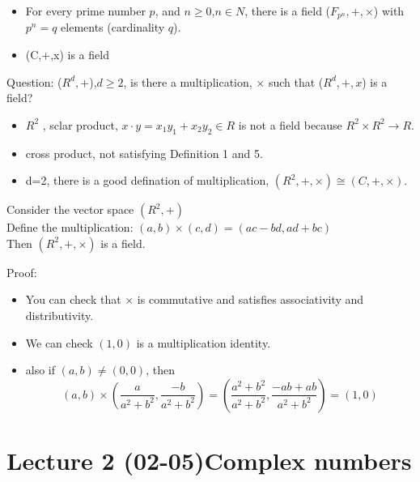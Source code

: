 \begin{example}[Fields]{}
    \begin{itemize}
        \item For every prime number $p$, and $n \geq 0$,$n \in N$, there is a field ($F_{p^n},+,\times$) with $p^n=q$ elements (cardinality $q$).
        \item (C,+,x) is a field
    \end{itemize}
    \end{example}
Question: ($R^d,+$),$d\geq 2$, is there a multiplication, $\times$ such that ($R^d,+,x$) is a field?
\begin{itemize}
    \item $R^2$ , sclar product, $x \cdot y=x_1y_1+x_2y_2 \in R$ is not a field because $R^2 \times R^2 \rightarrow R$.
    \item cross product, not satisfying Definition 1 and 5.
    \item d=2, there is a good defination of multiplication, $(R^2,+,\times)\cong (C,+,\times)$.
\end{itemize}
\begin{lemma}{1}{}
    Consider the vector space $(R^2,+)$
    \\Define the multiplication:
    $(a,b) \times (c,d) = (ac-bd,ad+bc)$
    \\Then $(R^2,+,\times)$ is a field.
    \end{lemma}
Proof: 
\begin{itemize}
    \item You can check that $\times$ is commutative and satisfies associativity and distributivity.
    \item We can check $(1,0)$ is a multiplication identity.
    \item also if $(a,b) \neq (0,0)$, then $$(a,b) \times (\frac{a}{a^2+b^2} ,\frac{-b}{a^2+b^2})=(\frac{a^2+b^2}{a^2+b^2} ,\frac{-ab+ab}{a^2+b^2})=(1,0)$$
\end{itemize}

\section[Lecture 2 (02-05) -- {Complex numbers}]{Lecture 2 (02-05)Complex numbers}

